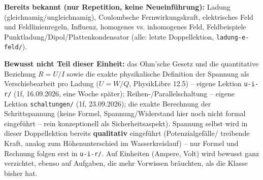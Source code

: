 \documentclass[11pt,a4paper]{article}
\begin{document}
\textbf{Bereits bekannt (nur Repetition, keine Neueinführung):} Ladung
(gleichnamig/ungleichnamig), Coulombsche Fernwirkungskraft, elektrisches
Feld und Feldlinienregeln, Influenz, homogenes vs. inhomogenes Feld,
Feldbeispiele Punktladung/Dipol/Plattenkondensator (alle: letzte
Doppellektion, \texttt{ladung-e-feld/}).

\textbf{Bewusst nicht Teil dieser Einheit:} das Ohm'sche Gesetz und die
quantitative Beziehung $R=U/I$ sowie die exakte physikalische Definition
der Spannung als Verschiebearbeit pro Ladung ($U=W/Q$, PhysikLibre 12.5)
-- eigene Lektion \texttt{u-i-r/} (1f, 16.09.2026, eine Woche später);
Reihen-/Parallelschaltung -- eigene Lektion \texttt{schaltungen/} (1f,
23.09.2026); die exakte Berechnung der Schrittspannung (keine Formel,
Spannung/Widerstand hier noch nicht formal eingeführt -- rein
konzeptionell als Sicherheitsaspekt). Spannung selbst wird in dieser
Doppellektion bereits \textbf{qualitativ} eingeführt (Potenzialgefälle/
treibende Kraft, analog zum Höhenunterschied im Wasserkreislauf) -- nur
Formel und Rechnung folgen erst in \texttt{u-i-r/}. Auf Einheiten
(Ampere, Volt) wird bewusst ganz verzichtet, ebenso auf Aufgaben, die
mehr Vorwissen bräuchten, als die Klasse bisher hat.
\end{document}
